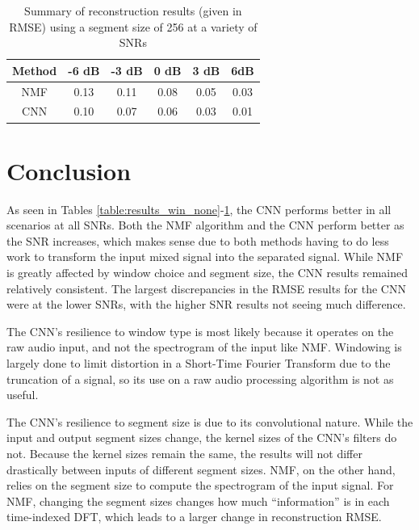 \documentclass[12pt,chapterheads]{ucsd}
\begin{document}
\vspace{0.25in}
\begin{table}[!ht]
\caption{Summary of reconstruction results (given in RMSE) using a segment size of 256 at a variety of SNRs}

\vspace{-0.25in}
\begin{center}
\begin{tabular}{| c | c | c |  c | c | c |}

\hline
Method & -6 dB & -3 dB & 0 dB & 3 dB & 6dB \\

\hline
NMF & 0.13 & 0.11 & 0.08 & 0.05 & 0.03 \\

\hline
CNN & 0.10 & 0.07 & 0.06 & 0.03 & 0.01 \\

\hline
\end{tabular}
\end{center}
\label{table:results_seg_1024}
\end{table}

\section{Conclusion}
As seen in Tables \ref{table:results_win_none}-\ref{table:results_seg_1024}, the CNN performs better in all scenarios at all SNRs. Both the NMF algorithm and the CNN perform better as the SNR increases, which makes sense due to both methods having to do less work to transform the input mixed signal into the separated signal. While NMF is greatly affected by window choice and segment size, the CNN results remained relatively consistent. The largest discrepancies in the RMSE results for the CNN were at the lower SNRs, with the higher SNR results not seeing much difference.

The CNN's resilience to window type is most likely because it operates on the raw audio input, and not the spectrogram of the input like NMF. Windowing is largely done to limit distortion in a Short-Time Fourier Transform due to the truncation of a signal, so its use on a raw audio processing algorithm is not as useful.

The CNN's resilience to segment size is due to its convolutional nature. While the input and output segment sizes change, the kernel sizes of the CNN's filters do not. Because the kernel sizes remain the same, the results will not differ drastically between inputs of different segment sizes. NMF, on the other hand, relies on the segment size to compute the spectrogram of the input signal. For NMF, changing the segment sizes changes how much ``information'' is in each time-indexed DFT, which leads to a larger change in reconstruction RMSE.
\end{document}
